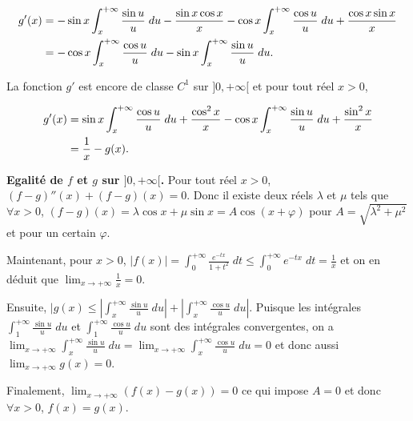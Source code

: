 {{\begin{align*}\ensuremath
g'(x)&=-\sin x\int_{x}^{+\infty}\frac{\sin u}{u}\;du-\frac{\sin x\cos x}{x}-\cos x\int_{x}^{+\infty}\frac{\cos u}{u}\;du+\frac{\cos x\sin x}{x}\\
 &=-\cos x\int_{x}^{+\infty}\frac{\cos u}{u}\;du-\sin x\int_{x}^{+\infty}\frac{\sin u}{u}\;du.
\end{align*}

La fonction $g'$ est encore de classe $C^1$ sur $]0,+\infty[$ et pour tout réel $x>0$,

\begin{align*}\ensuremath
g'(x)&=\sin x\int_{x}^{+\infty}\frac{\cos u}{u}\;du+\frac{\cos^2 x}{x}-\cos x\int_{x}^{+\infty}\frac{\sin u}{u}\;du+\frac{\sin^2 x}{x}\\
 &=\frac{1}{x}-g(x).
\end{align*}

\begin{center}
\end{center}

\textbf{Egalité de $f$ et $g$ sur $]0,+\infty[$.} Pour tout réel $x>0$, $(f-g)''(x)+(f-g)(x)=0$. Donc il existe deux réels $\lambda$ et $\mu$ tels que $\forall x>0$, $(f-g)(x)=\lambda\cos x+\mu\sin x=A\cos(x+\varphi)$ pour $A=\sqrt{\lambda^2+\mu^2}$ et pour un certain $\varphi$.

Maintenant, pour $x>0$, $|f(x)|=\int_{0}^{+\infty}\frac{e^{-tx}}{1+t^2}\;dt\leqslant\int_{0}^{+\infty}e^{-tx}\;dt=\frac{1}{x}$ et on en déduit que $\lim_{x \rightarrow +\infty}\frac{1}{x}=0$.

Ensuite, $|g(x)\leqslant\left|\int_{x}^{+\infty}\frac{\sin u}{u}\;du\right|+\left|\int_{x}^{+\infty}\frac{\cos u}{u}\;du\right|$. Puisque les intégrales $\int_{1}^{+\infty}\frac{\sin u}{u}\;du$ et $\int_{1}^{+\infty}\frac{\cos u}{u}\;du$ sont des intégrales convergentes, on a $\lim_{x \rightarrow +\infty}\int_{x}^{+\infty}\frac{\sin u}{u}\;du=\lim_{x \rightarrow +\infty}\int_{x}^{+\infty}\frac{\cos u}{u}\;du=0$ et donc aussi $\lim_{x \rightarrow +\infty}g(x)=0$.

Finalement, $\lim_{x \rightarrow +\infty}(f(x)-g(x))=0$ ce qui impose $A=0$ et donc $\forall x>0$, $f(x)=g(x)$.

\begin{center}
\end{center}

}}
